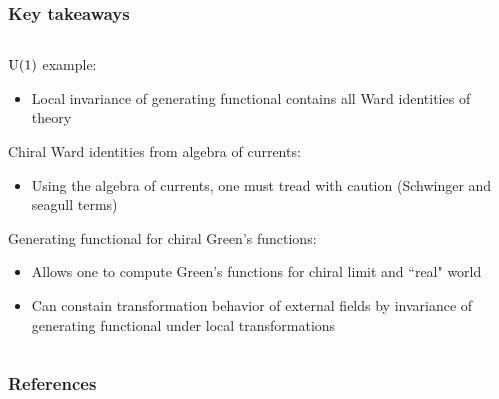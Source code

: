 \documentclass[accentcolor=tud2c,usenames,dvipsnames,colorbacktitle,inverttitle,landscape,german,presentation,t]{tudbeamer}
\begin{document}
  \begin{frame}
    \frametitle{Key takeaways}
    \begin{columns}[c]
      \begin{column}{0.8\textwidth}
        $\textrm{U}(1)$ example:
        \begin{itemize}
          \item Local invariance of generating functional contains all Ward identities of theory
        \end{itemize}

        Chiral Ward identities from algebra of currents:
        \begin{itemize}
          \item Using the algebra of currents, one must tread with caution (Schwinger and seagull terms)
        \end{itemize}

        Generating functional for chiral Green's functions:
        \begin{itemize}
          \item Allows one to compute Green's functions for chiral limit and ``real" world
          \item Can constain transformation behavior of external fields by invariance of generating functional under local transformations
        \end{itemize}
      \end{column}


    \end{columns}
  \end{frame}





  \begin{frame}[allowframebreaks]
    \frametitle{References}
    
    
  \end{frame}
\end{document}
